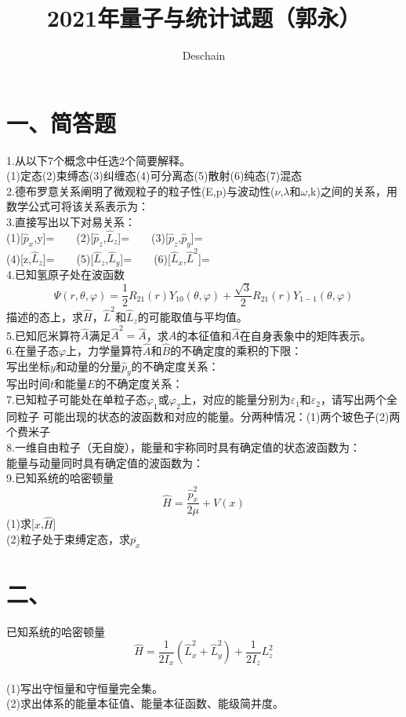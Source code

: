 \documentclass[UTF8]{ctexart}
\title{2021年量子与统计试题（郭永）}
\author{Deschain}
\begin{document}
\maketitle
\section*{一、简答题}
1.从以下7个概念中任选2个简要解释。\\
(1)定态(2)束缚态(3)纠缠态(4)可分离态(5)散射(6)纯态(7)混态\\
2.德布罗意关系阐明了微观粒子的粒子性(E,p)与波动性($\nu$,$\lambda$和$\omega$,k)之间的关系，用数学公式可将该关系表示为：\\
3.直接写出以下对易关系：\\
(1)[$\hat p_x$,y]=$\quad\quad$(2)[$\hat p_z$,$\hat L_z$]=$\quad\quad$(3)[$\hat p_z$,$\hat p_y$]=$\quad\quad$\\
(4)[z,$\hat L_z$]=$\quad\quad$(5)[$\hat L_z$,$\hat L_y$]=$\quad\quad$(6)[$\hat L_x$,$\hat L^2$]=$\quad\quad$\\
4.已知氢原子处在波函数\[
  \varPsi(r,\theta,\varphi)=\frac{1}{2}R_{21}(r)Y_{10}(\theta,\varphi)+\frac{\sqrt{3}}{2}R_{21}(r)Y_{1-1}(\theta,\varphi)
\]描述的态上，求$\hat H$，$\hat L^2$和$\hat L_z$的可能取值与平均值。\\
5.已知厄米算符$\hat A$满足$\hat A^2 = \hat A$，求$\hat A$的本征值和$\hat A$在自身表象中的矩阵表示。\\
6.在量子态$\varphi$上，力学量算符$\hat A$和$\hat B$的不确定度的乘积的下限：\\
写出坐标$y$和动量的分量$\hat p_y$的不确定度关系：\\
写出时间$t$和能量$E$的不确定度关系：\\
7.已知粒子可能处在单粒子态$\varphi_1$或$\varphi_2$上，对应的能量分别为$\varepsilon_1$和$\varepsilon_2$，请写出两个全同粒子
可能出现的状态的波函数和对应的能量。分两种情况：(1)两个玻色子(2)两个费米子\\
8.一维自由粒子（无自旋），能量和宇称同时具有确定值的状态波函数为：\\
能量与动量同时具有确定值的波函数为：\\
9.已知系统的哈密顿量\[
  \hat H=\frac{\hat p_x^2}{2\mu}+V(x)
\]
(1)求[$x$,$\hat H$]\\
(2)粒子处于束缚定态，求$\overline{p_x}$\\
\section*{二、}
已知系统的哈密顿量\[\hat H=\frac{1}{2I_x}(\hat L_x^2+\hat L_y^2)+\frac{1}{2I_z}L_z^2\]\\
(1)写出守恒量和守恒量完全集。\\
(2)求出体系的能量本征值、能量本征函数、能级简并度。\\
\end{document}
